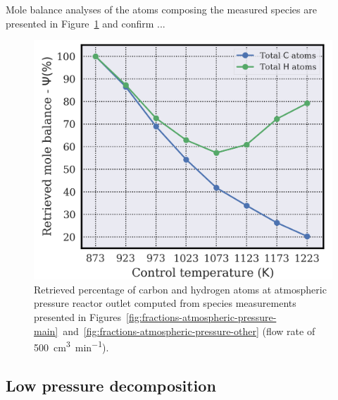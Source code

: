 \documentclass[final,3p,times,twocolumn,sort&compress]{elsarticle}
\begin{document}

Mole balance analyses of the atoms composing the measured species are presented in Figure~\ref{fig:balance-atmospheric-pressure} and confirm ...

\begin{figure}[h]
	\centering
	\includegraphics[width=\linewidth]
	{figures/balance_atmospheric_pressure}
	\caption{\label{fig:balance-atmospheric-pressure}Retrieved percentage of carbon and hydrogen atoms at atmospheric pressure reactor outlet computed from species measurements presented in Figures~\ref{fig:fractions-atmospheric-pressure-main}~and~\ref{fig:fractions-atmospheric-pressure-other} (flow rate of \SI{500}{\cubic\centi\metre\per\minute}).}
\end{figure}

%

\subsection{Low pressure decomposition}
\end{document}

